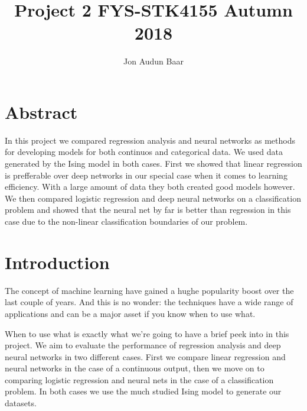 \documentclass[a4paper,english]{article}
\title {Project 2 FYS-STK4155 Autumn 2018}
\author {Jon Audun Baar}
\begin{document}
\maketitle


\section*{Abstract}
In this project we compared regression analysis and neural networks as 
methods for developing models for both continuos and 
categorical data. 
We used data generated by the Ising model in both cases. 
First we showed that linear regression is prefferable over 
deep networks in our special case when it comes to 
learning efficiency. With a large amount of data they both 
created good models however. 
We then compared logistic regression and deep neural networks on 
a classification problem and showed that the neural net by far
is better than regression in this case due to the non-linear 
classification boundaries of our problem.

\section{Introduction}
The concept of machine learning have gained a hughe popularity boost over 
the last couple of years. And this is no wonder: the techniques 
have a wide range of applications and can be a major asset
if you know when to use what.
\par
When to use what is exactly what we're going to have a brief
peek into in this project. 
We aim to evaluate the performance of regression analysis and deep
neural networks in two different cases. 
First we compare linear regression and neural networks in the case 
of a continuous output, then we move on to comparing logistic regression
and neural nets in the case of a classification problem. 
In both cases we use the much studied Ising model to generate our datasets.
\end{document}
